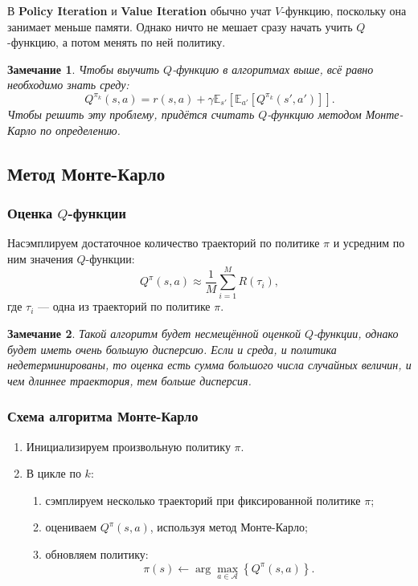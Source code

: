 \documentclass[12pt,a4paper]{article}
\newtheorem{remark}{Замечание}
\begin{document}
В \textbf{Policy Iteration} и \textbf{Value Iteration} обычно учат $V$-функцию, поскольку она занимает меньше памяти. Однако ничто не мешает сразу начать учить $Q$-функцию, а потом менять по ней политику.

\begin{remark}
Чтобы выучить $Q$-функцию в алгоритмах выше, всё равно необходимо знать среду:
\[
Q^{\pi_k}(s,a)
=
r(s,a)
+
\gamma
\mathbb E_{s'}
\left[
\mathbb E_{a'}
\left[
Q^{\pi_k}(s',a')
\right]
\right].
\]
Чтобы решить эту проблему, придётся считать $Q$-функцию методом Монте-Карло по определению.
\end{remark}

\subsection{Метод Монте-Карло}

\subsubsection{Оценка $Q$-функции}

Насэмплируем достаточное количество траекторий по политике $\pi$ и усредним по ним значения $Q$-функции:
\[
Q^\pi(s,a)
\approx
\frac{1}{M}
\sum_{i=1}^{M}
R(\tau_i),
\]
где $\tau_i$ --- одна из траекторий по политике $\pi$.

\begin{remark}
Такой алгоритм будет несмещённой оценкой $Q$-функции, однако будет иметь очень большую дисперсию. Если и среда, и политика недетерминированы, то оценка есть сумма большого числа случайных величин, и чем длиннее траектория, тем больше дисперсия.
\end{remark}

\subsubsection{Схема алгоритма Монте-Карло}

\begin{enumerate}
    \item Инициализируем произвольную политику $\pi$.

    \item В цикле по $k$:
    \begin{enumerate}
        \item сэмплируем несколько траекторий при фиксированной политике $\pi$;

        \item оцениваем $Q^\pi(s,a)$, используя метод Монте-Карло;

        \item обновляем политику:
        \[
        \pi(s)
        \leftarrow
        \arg\max_{a \in \mathcal A}
        \left\{
        Q^\pi(s,a)
        \right\}.
        \]
    \end{enumerate}
\end{enumerate}
\end{document}
